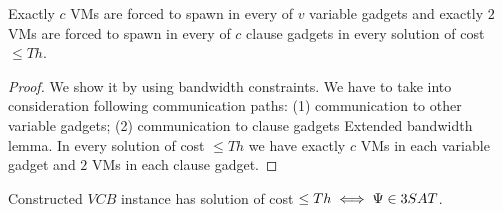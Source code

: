 \begin{lemma}
Exactly $c$ VMs are forced to spawn in every of $v$ variable gadgets
and exactly $2$ VMs are forced to spawn in every of $c$ clause gadgets
in every solution of cost $\leq Th$.
\end{lemma}

\begin{proof}
We show it by using bandwidth constraints. We have to take into
consideration following communication paths: (1) communication to
other variable gadgets; (2) communication to clause gadgets Extended
bandwidth lemma. In every solution of cost $\leq Th$ we have exactly
$c$ VMs in each variable gadget and $2$ VMs in each clause gadget.

\end{proof}

\begin{theorem}Constructed $VCB$ instance has solution of cost $\leq
  Th \iff \Psi \in 3SAT$.
\end{theorem}

